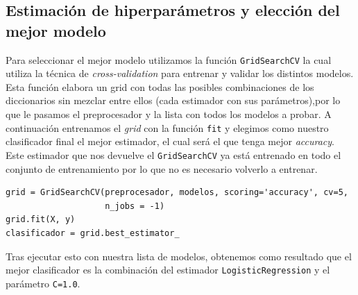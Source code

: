 \documentclass[size=a4, parskip=half, titlepage=false, toc=flat, toc=bib, 12pt]{scrartcl}
\begin{document}
\subsection{Estimación de hiperparámetros y elección del mejor modelo}

Para seleccionar el mejor modelo utilizamos la función \verb|GridSearchCV| la cual utiliza la técnica de \textit{cross-validation} para entrenar y validar los distintos modelos. Esta función elabora un grid con todas las posibles combinaciones de los diccionarios sin mezclar entre ellos (cada estimador con sus parámetros),por lo que le pasamos el preprocesador y la lista con todos los modelos a probar. A continuación entrenamos el \textit{grid} con la función \verb|fit| y elegimos como nuestro clasificador final el mejor estimador, el cual será el que tenga mejor \textit{accuracy}. Este estimador que nos devuelve el \verb|GridSearchCV| ya está entrenado en todo el conjunto de entrenamiento por lo que no es necesario volverlo a entrenar.
\begin{verbatim}
grid = GridSearchCV(preprocesador, modelos, scoring='accuracy', cv=5,
                    n_jobs = -1)
grid.fit(X, y)
clasificador = grid.best_estimator_
\end{verbatim}

Tras ejecutar esto con nuestra lista de modelos, obtenemos como resultado que el mejor clasificador es la combinación del estimador \verb|LogisticRegression| y el parámetro \verb|C=1.0|.
\end{document}
